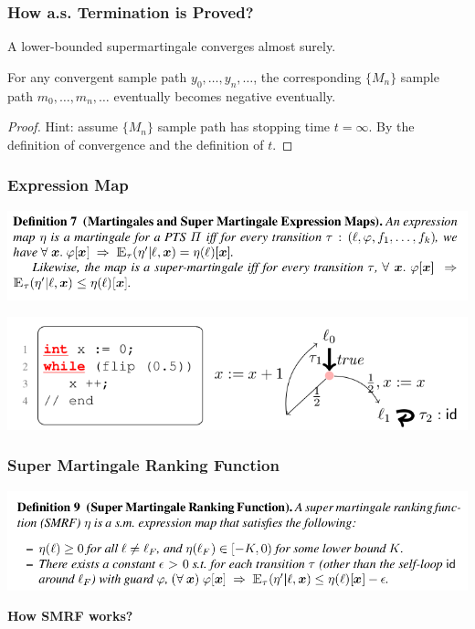 \documentclass[11pt]{beamer}
\begin{document}
\begin{frame}\frametitle{How a.s. Termination is Proved?}

\begin{theorem}

A lower-bounded supermartingale converges almost surely.

\end{theorem}

\begin{lemma}
For any convergent sample path $y_0, \ldots, y_n, \ldots$, the corresponding $\{M_n\}$ sample path $m_0, \ldots, m_n, \ldots$ eventually becomes negative eventually.
\end{lemma}

\begin{proof}
Hint: assume $\{M_n\}$ sample path has stopping time $t = \infty$. By the definition of convergence and the definition of $t$.
\end{proof}

\end{frame}

\begin{frame}\frametitle{Expression Map}
\begin{center}
\includegraphics[scale=0.35]{expmapdef.png}

\end{center}
\begin{example}

\begin{center}

\includegraphics[scale=0.35]{example_map.png}

\end{center}
\end{example}
\end{frame}

\begin{frame}\frametitle{Super Martingale Ranking Function}
\begin{center}

\includegraphics[scale=0.35]{smrfdef.png}


\textbf{How SMRF works?}
\end{center}


\end{frame}
\end{document}
